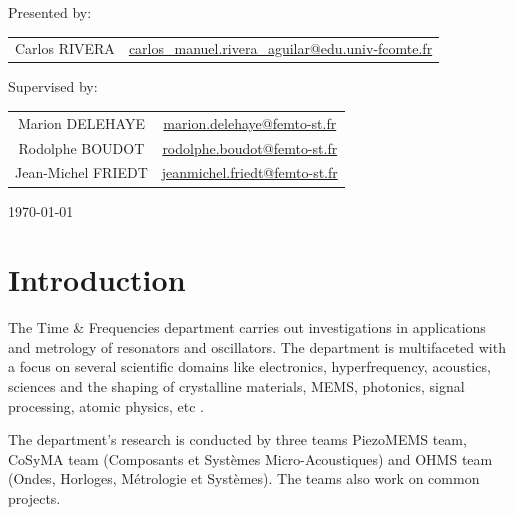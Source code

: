 \documentclass[a4paper,12pt]{article}
\begin{document}
\begin{titlepage}
\begin{center}
\vspace{2cm}
Presented by:\\ [0.4cm]
\begin{tabular}{ c    |    c } 
    Carlos RIVERA &  \normalsize \href{mailto:carlos_manuel.rivera_aguilar@edu.univ-fcomte.fr}{carlos\_manuel.rivera\_aguilar@edu.univ-fcomte.fr}
\end{tabular}
\end{center}
\vspace{2cm}
\begin{center}
Supervised by:\\ [0.4cm]
\begin{tabular}{ c    |    c } 
    Marion DELEHAYE &  \normalsize \href{mailto:marion.delehaye@femto-st.fr}{marion.delehaye@femto-st.fr} \\
    Rodolphe BOUDOT &  \normalsize \href{mailto:rodolphe.boudot@femto-st.fr}{rodolphe.boudot@femto-st.fr} \\
    Jean-Michel FRIEDT &  \normalsize \href{mailto:jeanmichel.friedt@femto-st.fr}{jeanmichel.friedt@femto-st.fr} \\
\end{tabular}
\end{center}
\vfill
{\large \today}\\[1cm] 
\vfill 

\end{titlepage}
  
\tableofcontents
\thispagestyle{empty}
\newpage
\listoffigures
\thispagestyle{empty}
\lstlistoflistings
\thispagestyle{empty}
\pagebreak

\setcounter{page}{1}

\section{Introduction} 
The Time \& Frequencies department carries out investigations in applications and metrology of resonators and oscillators. The department is multifaceted with a focus on several scientific domains like electronics, hyperfrequency, acoustics, sciences and the shaping of crystalline materials, MEMS, photonics, signal processing, atomic physics, etc \cite{2022}.

The department’s research is conducted by three teams PiezoMEMS team, CoSyMA team (Composants et Systèmes Micro-Acoustiques) and OHMS team (Ondes, Horloges, Métrologie et Systèmes). The teams also work on common projects.
\end{document}
